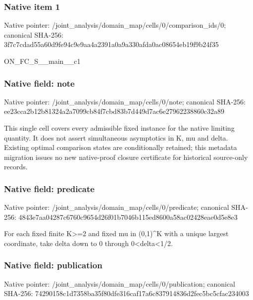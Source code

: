 \documentclass[10pt,a4paper]{article}
\begin{document}
\subsubsection{Native item 1}
Native pointer: /joint\_\allowbreak{}analysis/domain\_\allowbreak{}map/cells/0/comparison\_\allowbreak{}ids/0; canonical SHA-256: 3f7c7cdad55a60d9fe94c9e9aa4a2391a0a9a330afda0ac08654eb19f9b24f35

\begingroup\raggedright\sloppy ON\_\allowbreak{}FC\_\allowbreak{}S\_\allowbreak{}\_\allowbreak{}main\_\allowbreak{}\_\allowbreak{}c1\par\endgroup

\subsubsection{Native field: note}
Native pointer: /joint\_\allowbreak{}analysis/domain\_\allowbreak{}map/cells/0/note; canonical SHA-256: ee23cca2b12b81324a2a7099cb84f7cbd83b7d449d7ac6e27962238860c32a89

\begingroup\raggedright\sloppy This single cell covers every admissible fixed instance for the native limiting quantity. It does not assert simultaneous asymptotics in K,\allowbreak{} mu and delta. Existing optimal comparison states are conditionally retained;\allowbreak{} this metadata migration issues no new native-proof closure certificate for historical source-only records.\par\endgroup

\subsubsection{Native field: predicate}
Native pointer: /joint\_\allowbreak{}analysis/domain\_\allowbreak{}map/cells/0/predicate; canonical SHA-256: 4843e7aa04287c6760c9654d26f01b7046b115ed8600a58ac02428eae0d5e8e3

\begingroup\raggedright\sloppy For each fixed finite K>=\allowbreak{}2 and fixed mu in (0,\allowbreak{}1)\textasciicircum{}K with a unique largest coordinate,\allowbreak{} take delta down to 0 through 0<delta<1/\allowbreak{}2.\par\endgroup

\subsubsection{Native field: publication}
Native pointer: /joint\_\allowbreak{}analysis/domain\_\allowbreak{}map/cells/0/publication; canonical SHA-256: 74290158c1d7358ba35f80dfe316caf17a6c837914836d2fec5bc5cfac234003
\end{document}
